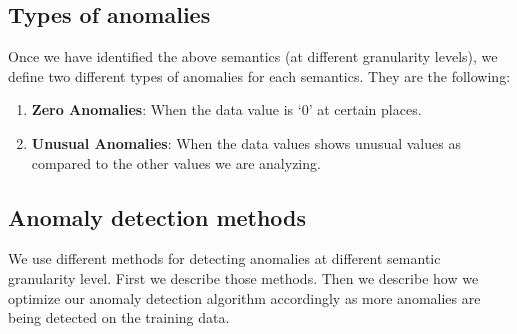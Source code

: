 \documentclass[10pt]{sigplanconf}
\begin{document}
\subsection{Types of anomalies}
Once we have identified the above semantics (at different granularity levels), we define two different types of anomalies for each semantics.  They are the following:

\begin{enumerate}
\item \textbf{Zero Anomalies}:  When the data value is `0' at certain places.
\item \textbf{Unusual Anomalies}:  When the data values shows unusual values as compared to the other values we are analyzing.
\end{enumerate}

\subsection{Anomaly detection methods}

We use different methods for detecting anomalies at different semantic granularity level.  First we describe those methods.  Then we describe how we optimize our anomaly detection algorithm accordingly as more anomalies are being detected on the training data.  
\end{document}
